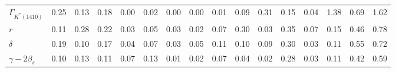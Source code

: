 \begin{tabular}{l  c  c  c  c  c  c  c  c  c  c  c  c  c  c  | c }
$\Gamma_{K^{*}(1410)}$ & 0.25 & 0.13 & 0.18 & 0.00 & 0.02 & 0.00 & 0.00 & 0.01 & 0.09 & 0.31 & 0.15 & 0.04 & 1.38 & 0.69 & 1.62 \\ 
$r$ & 0.11 & 0.28 & 0.22 & 0.03 & 0.05 & 0.03 & 0.02 & 0.07 & 0.30 & 0.03 & 0.35 & 0.07 & 0.15 & 0.46 & 0.78 \\ 
$\delta$ & 0.19 & 0.10 & 0.17 & 0.04 & 0.07 & 0.03 & 0.05 & 0.11 & 0.10 & 0.09 & 0.30 & 0.03 & 0.11 & 0.55 & 0.72 \\ 
$\gamma - 2 \beta_{s}$ & 0.10 & 0.13 & 0.11 & 0.07 & 0.13 & 0.01 & 0.02 & 0.07 & 0.04 & 0.02 & 0.28 & 0.03 & 0.11 & 0.42 & 0.59 \\ 
\hline
\hline
\end{tabular}
